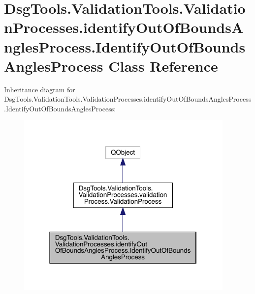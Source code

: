 \hypertarget{class_dsg_tools_1_1_validation_tools_1_1_validation_processes_1_1identify_out_of_bounds_angles_p018c2eea3681ae6533cd0c1659513e7b}{}\section{Dsg\+Tools.\+Validation\+Tools.\+Validation\+Processes.\+identify\+Out\+Of\+Bounds\+Angles\+Process.\+Identify\+Out\+Of\+Bounds\+Angles\+Process Class Reference}
\label{class_dsg_tools_1_1_validation_tools_1_1_validation_processes_1_1identify_out_of_bounds_angles_p018c2eea3681ae6533cd0c1659513e7b}


Inheritance diagram for Dsg\+Tools.\+Validation\+Tools.\+Validation\+Processes.\+identify\+Out\+Of\+Bounds\+Angles\+Process.\+Identify\+Out\+Of\+Bounds\+Angles\+Process\+:
\nopagebreak
\begin{figure}[H]
\begin{center}
\leavevmode
\includegraphics[width=303pt]{class_dsg_tools_1_1_validation_tools_1_1_validation_processes_1_1identify_out_of_bounds_angles_pa2451744aa5f98df5aaa89ddd1c2a025}
\end{center}
\end{figure}


